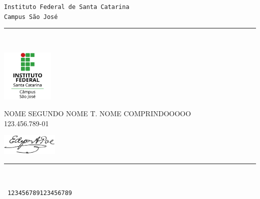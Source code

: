 \documentclass[11pt,a4paper]{memoir}
\begin{document}
    \begin{Spacing}{0.75}%
    \noindent
    \texttt{\fontsize{4mm}{5mm}\selectfont Instituto Federal de Santa Catarina}\\
    \texttt{\fontsize{3mm}{4mm}\selectfont Campus São José }\\ 
    \rule{74mm}{.3mm}\\
    \begin{minipage}[t]{33mm}
        \vspace{-1mm}%
        \hspace{-4mm}\includegraphics[height=25mm]{logo-ifsc-saojose.png}
    \end{minipage}
    \hspace{1mm}
    \begin{minipage}[t]{42mm}
        \vspace{-0mm}%
        \begin{flushleft}
        {\scriptsize
            \begin{Spacing}{1}%
            \vspace{1mm}
             {NOME SEGUNDO NOME T. NOME COMPRINDOOOOO}\\
             \hspace{1mm} 123.456.789-01\\
            \end{Spacing}
        }
    \begin{minipage}[t]{33mm}
        \vspace{-0mm}%
        \includegraphics[height=10mm]{assinatura.png}
    \vspace{1mm}
    \end{minipage}
        \end{flushleft}
    \end{minipage}
    \vspace{1mm}
    \rule{74mm}{0.3mm}\\
    \end{Spacing}
    \vspace{-6mm} \hspace{40mm} \texttt{\fontsize{2mm}{3mm} 123456789123456789}
\end{document}

